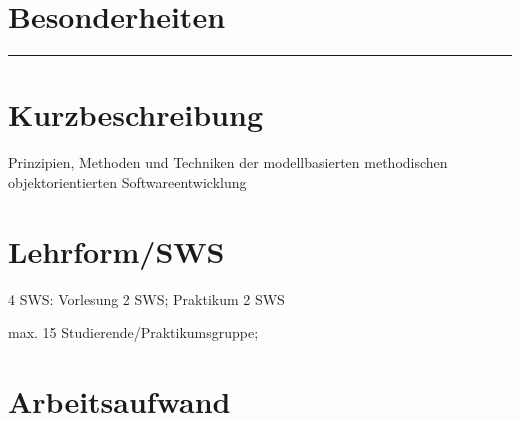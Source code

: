 \hypertarget{besonderheitenpathlabel....srcmodulbeschreibungen-bachelor-bpo5ba_entwicklung-von-system-architekturen}{%
\section*{Besonderheiten\label{../../src/modulbeschreibungen-bachelor-bpo5/BA_Entwicklung-von-System-Architekturen}}\label{besonderheitenpathlabel....srcmodulbeschreibungen-bachelor-bpo5ba_entwicklung-von-system-architekturen}}

\begin{center}\rule{0.5\linewidth}{0.5pt}\end{center}

\hypertarget{kurzbeschreibungpathlabel....srcmodulbeschreibungen-bachelor-bpo5ba_entwicklung-von-system-architekturen}{%
\section*{Kurzbeschreibung\label{../../src/modulbeschreibungen-bachelor-bpo5/BA_Entwicklung-von-System-Architekturen}}\label{kurzbeschreibungpathlabel....srcmodulbeschreibungen-bachelor-bpo5ba_entwicklung-von-system-architekturen}}

Prinzipien, Methoden und Techniken der modellbasierten methodischen
objektorientierten Softwareentwicklung

\hypertarget{lehrformswspathlabel....srcmodulbeschreibungen-bachelor-bpo5ba_entwicklung-von-system-architekturen}{%
\section*{Lehrform/SWS\label{../../src/modulbeschreibungen-bachelor-bpo5/BA_Entwicklung-von-System-Architekturen}}\label{lehrformswspathlabel....srcmodulbeschreibungen-bachelor-bpo5ba_entwicklung-von-system-architekturen}}

4 SWS: Vorlesung 2 SWS; Praktikum 2 SWS

max. 15 Studierende/Praktikumsgruppe;

\hypertarget{arbeitsaufwandpathlabel....srcmodulbeschreibungen-bachelor-bpo5ba_entwicklung-von-system-architekturen}{%
\section*{Arbeitsaufwand\label{../../src/modulbeschreibungen-bachelor-bpo5/BA_Entwicklung-von-System-Architekturen}}\label{arbeitsaufwandpathlabel....srcmodulbeschreibungen-bachelor-bpo5ba_entwicklung-von-system-architekturen}}

